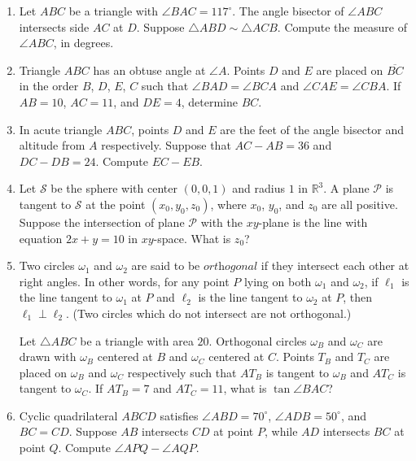 \documentclass[10pt]{article}
\begin{document}
\begin{enumerate}

\item Let $ABC$ be a triangle with $\angle BAC=117^\circ$.  The angle bisector of $\angle ABC$ intersects side $AC$ at $D$.  Suppose $\triangle ABD\sim\triangle ACB$.  Compute the measure of $\angle ABC$, in degrees.

\item Triangle $ABC$ has an obtuse angle at $\angle A$.  Points $D$ and $E$ are placed on $\overline{BC}$ in the order $B$, $D$, $E$, $C$ such that $\angle BAD=\angle BCA$ and $\angle CAE=\angle CBA$.  If $AB=10$, $AC=11$, and $DE=4$, determine $BC$.

\item In acute triangle $ABC$, points $D$ and $E$ are the feet of the angle bisector and altitude from $A$ respectively.  Suppose that $AC - AB = 36$ and $DC - DB = 24$.  Compute $EC - EB$.

\item Let $\mathcal S$ be the sphere with center $(0,0,1)$ and radius $1$ in $\mathbb R^3$.  A plane $\mathcal P$ is tangent to $\mathcal S$ at the point $(x_0,y_0,z_0)$, where $x_0$, $y_0$, and $z_0$ are all positive.  Suppose the intersection of plane $\mathcal P$ with the $xy$-plane is the line with equation $2x+y=10$ in $xy$-space.  What is $z_0$?

\item Two circles $\omega_1$ and $\omega_2$ are said to be $\textit{orthogonal}$ if they intersect each other at right angles.  In other words, for any point $P$ lying on both $\omega_1$ and $\omega_2$, if $\ell_1$ is the line tangent to $\omega_1$ at $P$ and $\ell_2$ is the line tangent to $\omega_2$ at $P$, then $\ell_1\perp \ell_2$.  (Two circles which do not intersect are not orthogonal.)

\par Let $\triangle ABC$ be a triangle with area $20$.  Orthogonal circles $\omega_B$ and $\omega_C$ are drawn with $\omega_B$ centered at $B$ and $\omega_C$ centered at $C$.  Points $T_B$ and $T_C$ are placed on $\omega_B$ and $\omega_C$ respectively such that $AT_B$ is tangent to $\omega_B$ and $AT_C$ is tangent to $\omega_C$.  If $AT_B = 7$ and $AT_C = 11$, what is $\tan\angle BAC$?

\item Cyclic quadrilateral $ABCD$ satisfies $\angle ABD = 70^\circ$, $\angle ADB=50^\circ$, and $BC=CD$.  Suppose $AB$ intersects $CD$ at point $P$, while $AD$ intersects $BC$ at point $Q$.  Compute $\angle APQ-\angle AQP$.


\end{enumerate}
\end{document}
